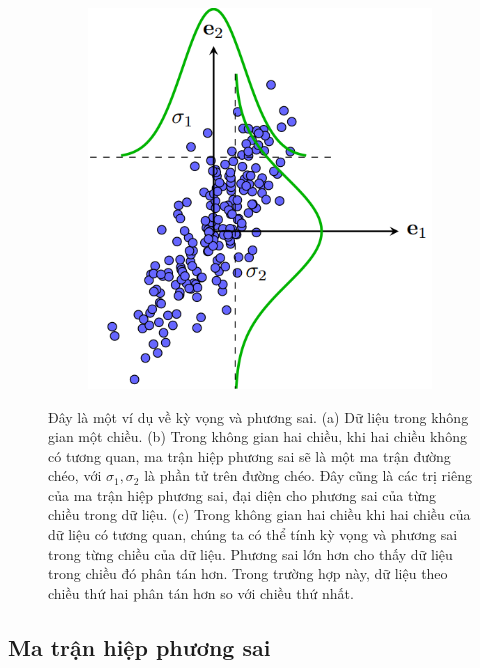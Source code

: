 \documentclass[12pt,a4paper,oneside]{report}
\numberwithin{equation}{section}
\begin{document}
\begin{figure}[t]
\begin{subfigure}{0.325\textwidth}
		\includegraphics[width=0.8\linewidth]{pca_var.png}
		\caption{}
		\label{fig:27_2c}
	\end{subfigure}
	\caption{
		Đây là một ví dụ về kỳ vọng và phương sai. (a) Dữ liệu trong không gian một chiều. (b) Trong không gian hai chiều, khi hai chiều không có tương quan, ma trận hiệp phương sai sẽ là một ma trận đường chéo, với $\sigma_1, \sigma_2$ là phần tử trên đường chéo. Đây cũng là các trị riêng của ma trận hiệp phương sai, đại diện cho phương sai của từng chiều trong dữ liệu. (c) Trong không gian hai chiều khi hai chiều của dữ liệu có tương quan, chúng ta có thể tính kỳ vọng và phương sai trong từng chiều của dữ liệu. Phương sai lớn hơn cho thấy dữ liệu trong chiều đó phân tán hơn. Trong trường hợp này, dữ liệu theo chiều thứ hai phân tán hơn so với chiều thứ nhất. }
	\label{fig:27_2}
\end{figure}

\subsection{Ma trận hiệp phương sai}
\end{document}
